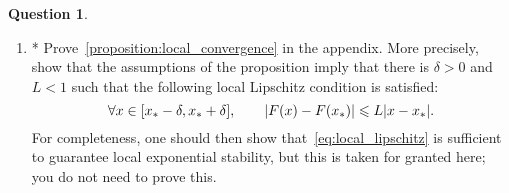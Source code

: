 \documentclass[11pt]{article}
\theoremstyle{definition}
\newtheorem{question}{Question}
\theoremstyle{remark}
\theoremstyle{plain}%
\begin{document}
\begin{question}
\begin{enumerate}
        \item
            *
            Prove~\cref{proposition:local_convergence} in the appendix.
            More precisely, show that the assumptions of the proposition imply that there is $\delta > 0$ and $L < 1$ such that the following local Lipschitz condition is satisfied:
            \begin{equation}
                \label{eq:local_lipschitz}
                \forall x \in [x_* - \delta, x_* + \delta],
                \qquad
                \lvert F(x) - F(x_*) \rvert \leqslant L \lvert x - x_*\rvert.
            \end{equation}
            For completeness, one should then show that~\eqref{eq:local_lipschitz} is sufficient to guarantee local exponential stability,
            but this is taken for granted here; you do not need to prove this.
    \end{enumerate}
\end{question}

\newpage

\newpage
\end{document}
